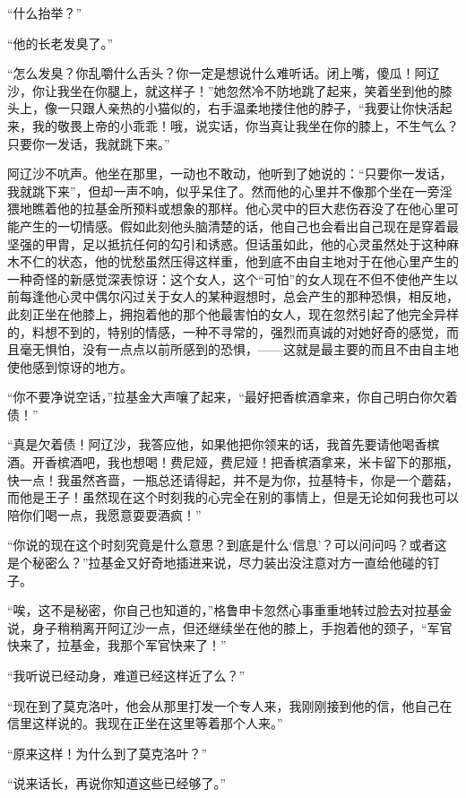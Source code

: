 \par “什么抬举？”
\par “他的长老发臭了。”
\par “怎么发臭？你乱嚼什么舌头？你一定是想说什么难听话。闭上嘴，傻瓜！阿辽沙，你让我坐在你腿上，就这样子！”她忽然冷不防地跳了起来，笑着坐到他的膝头上，像一只跟人亲热的小猫似的，右手温柔地搂住他的脖子，“我要让你快活起来，我的敬畏上帝的小乖乖！哦，说实话，你当真让我坐在你的膝上，不生气么？只要你一发话，我就跳下来。”
\par 阿辽沙不吭声。他坐在那里，一动也不敢动，他听到了她说的：“只要你一发话，我就跳下来”，但却一声不响，似乎呆住了。然而他的心里并不像那个坐在一旁淫猥地瞧着他的拉基金所预料或想象的那样。他心灵中的巨大悲伤吞没了在他心里可能产生的一切情感。假如此刻他头脑清楚的话，他自己也会看出自己现在是穿着最坚强的甲胄，足以抵抗任何的勾引和诱惑。但话虽如此，他的心灵虽然处于这种麻木不仁的状态，他的忧愁虽然压得这样重，他到底不由自主地对于在他心里产生的一种奇怪的新感觉深表惊讶：这个女人，这个“可怕”的女人现在不但不使他产生以前每逢他心灵中偶尔闪过关于女人的某种遐想时，总会产生的那种恐惧，相反地，此刻正坐在他膝上，拥抱着他的那个他最害怕的女人，现在忽然引起了他完全异样的，料想不到的，特别的情感，一种不寻常的，强烈而真诚的对她好奇的感觉，而且毫无惧怕，没有一点点以前所感到的恐惧，——这就是最主要的而且不由自主地使他感到惊讶的地方。
\par “你不要净说空话，”拉基金大声嚷了起来，“最好把香槟酒拿来，你自己明白你欠着债！”
\par “真是欠着债！阿辽沙，我答应他，如果他把你领来的话，我首先要请他喝香槟酒。开香槟酒吧，我也想喝！费尼娅，费尼娅！把香槟酒拿来，米卡留下的那瓶，快一点！我虽然吝啬，一瓶总还请得起，并不是为你，拉基特卡，你是一个蘑菇，而他是王子！虽然现在这个时刻我的心完全在别的事情上，但是无论如何我也可以陪你们喝一点，我愿意耍耍酒疯！”
\par “你说的现在这个时刻究竟是什么意思？到底是什么‘信息’？可以问问吗？或者这是个秘密么？”拉基金又好奇地插进来说，尽力装出没注意对方一直给他碰的钉子。
\par “唉，这不是秘密，你自己也知道的，”格鲁申卡忽然心事重重地转过脸去对拉基金说，身子稍稍离开阿辽沙一点，但还继续坐在他的膝上，手抱着他的颈子，“军官快来了，拉基金，我那个军官快来了！”
\par “我听说已经动身，难道已经这样近了么？”
\par “现在到了莫克洛叶，他会从那里打发一个专人来，我刚刚接到他的信，他自己在信里这样说的。我现在正坐在这里等着那个人来。”
\par “原来这样！为什么到了莫克洛叶？”
\par “说来话长，再说你知道这些已经够了。”
